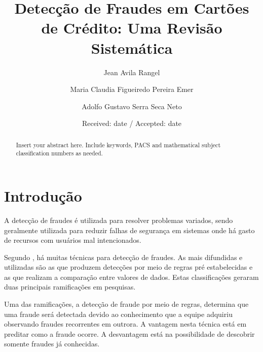 \documentclass[smallextended]{svjour3}       %
\begin{document}
	
\title{Detecção de Fraudes em Cartões de Crédito: Uma Revisão Sistemática
}
\subtitle{}


\author{Jean Avila Rangel         \and
	Maria Claudia Figueiredo Pereira Emer \and
	Adolfo Gustavo Serra Seca Neto
}

	\date{Received: date / Accepted: date}
	\maketitle
	
	\begin{abstract}
		Insert your abstract here. Include keywords, PACS and mathematical
		subject classification numbers as needed.
	\end{abstract}
	
\section{Introdução}

A detecção de fraudes é utilizada para resolver problemas variados, sendo geralmente utilizada para reduzir falhas de segurança em sistemas onde há gasto de recursos com usuários mal intencionados.

Segundo \cite{Fawcett1997}, há muitas técnicas para detecção de fraudes. As mais difundidas e utilizadas são as que produzem detecções por meio de regras pré estabelecidas e as que realizam a comparação entre valores de dados. Estas classificações geraram duas principais ramificações em pesquisas.

Uma das ramificações, a detecção de fraude por meio de regras, determina que uma fraude será detectada devido ao conhecimento que a equipe adquiriu observando fraudes recorrentes em outrora. A vantagem nesta técnica está em preditar como a fraude ocorre. A desvantagem está na possibilidade de descobrir somente fraudes já conhecidas.
\end{document}
